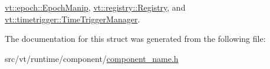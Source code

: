 \hyperlink{structvt_1_1epoch_1_1_epoch_manip_a3dcf9b105619194fddde4e26a638b856}{vt\+::epoch\+::\+Epoch\+Manip}, \hyperlink{structvt_1_1registry_1_1_registry_a8488eb3ab95e207094617027bb5c75c9}{vt\+::registry\+::\+Registry}, and \hyperlink{structvt_1_1timetrigger_1_1_time_trigger_manager_a8eba6c4f2596f9f8a6ad374ac020c8f4}{vt\+::timetrigger\+::\+Time\+Trigger\+Manager}.



The documentation for this struct was generated from the following file\+:\begin{DoxyCompactItemize}
\item 
src/vt/runtime/component/\hyperlink{component__name_8h}{component\+\_\+name.\+h}\end{DoxyCompactItemize}
